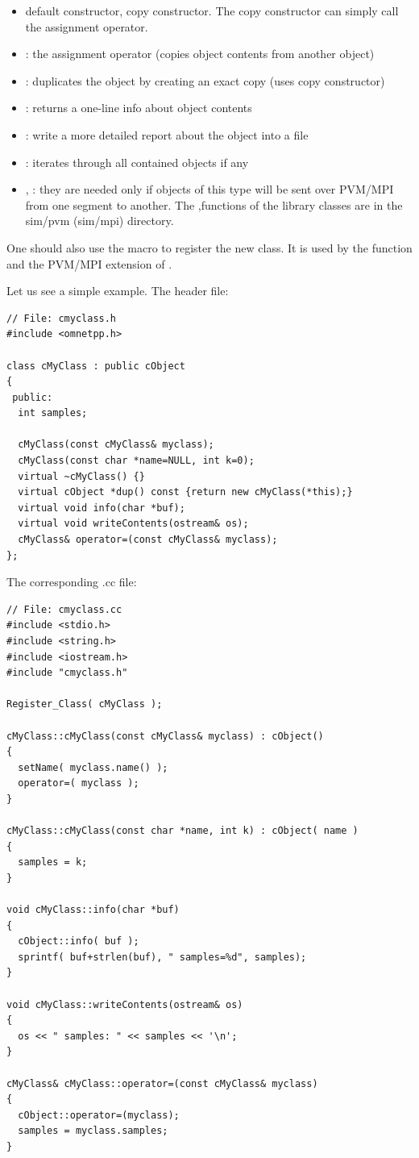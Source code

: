\begin{itemize}
  \item{default constructor, copy constructor. The copy constructor
    can simply call the assignment operator.}
  \item{: the assignment operator (copies object
    contents from another object)}
  \item{: duplicates the object by creating an exact copy
    (uses copy constructor)}
  \item{: returns a one-line info about object contents}
  \item{: write a more detailed report about the
    object into a file}
  \item{: iterates through all contained objects if
    any}
  \item{, : they are needed only if
    objects of this type will be sent over
    PVM/MPI from one segment to another.  The
    ,functions of the library
    classes are in the sim/pvm (sim/mpi) directory.}
\end{itemize}

One should also use the  macro to register the
new class. It is used by the  function and the
PVM/MPI extension of {\opp}.

Let us see a simple example. The header file:

\begin{verbatim}
// File: cmyclass.h
#include <omnetpp.h>

class cMyClass : public cObject
{
 public:
  int samples;

  cMyClass(const cMyClass& myclass);
  cMyClass(const char *name=NULL, int k=0);
  virtual ~cMyClass() {}
  virtual cObject *dup() const {return new cMyClass(*this);}
  virtual void info(char *buf);
  virtual void writeContents(ostream& os);
  cMyClass& operator=(const cMyClass& myclass);
};
\end{verbatim}

The corresponding .cc file:

\begin{verbatim}
// File: cmyclass.cc
#include <stdio.h>
#include <string.h>
#include <iostream.h>
#include "cmyclass.h"

Register_Class( cMyClass );

cMyClass::cMyClass(const cMyClass& myclass) : cObject()
{
  setName( myclass.name() );
  operator=( myclass );
}

cMyClass::cMyClass(const char *name, int k) : cObject( name )
{
  samples = k;
}

void cMyClass::info(char *buf)
{
  cObject::info( buf );
  sprintf( buf+strlen(buf), " samples=%d", samples);
}

void cMyClass::writeContents(ostream& os)
{
  os << " samples: " << samples << '\n';
}

cMyClass& cMyClass::operator=(const cMyClass& myclass)
{
  cObject::operator=(myclass);
  samples = myclass.samples;
}
\end{verbatim}


